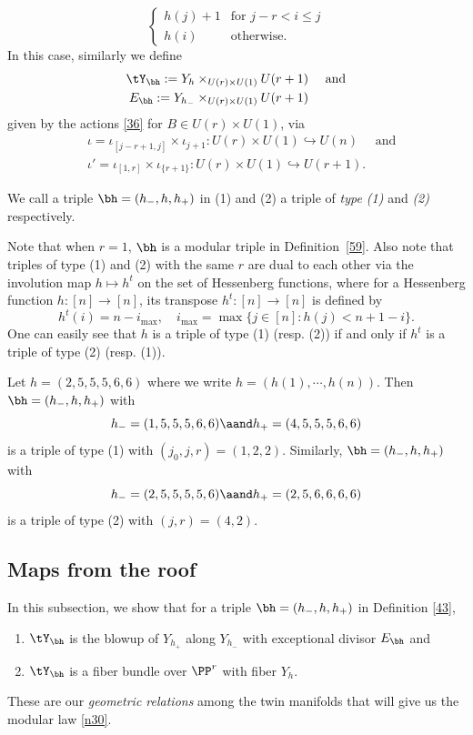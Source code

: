 \begin{definition}
\begin{enumerate}
\[\begin{cases}
			h(j)+1 &\text{for }j-r<i\leq j\\
		h(i) &\text{otherwise.}
		\end{cases}\]
		In this case, similarly we define 
		\begin{equation*}
			\begin{split}
				\tY_\bh :=Y_h\times_{U(r)\times U(1)}U(r+1)& \quad \text{ and}\\
				E_\bh:=Y_{h_-}\times_{U(r)\times U(1)}U(r+1)&
			\end{split}
		\end{equation*}
		given by the actions \eqref{36} for $B\in U(r)\times U(1)$,
		via 
		\begin{equation*}
			\begin{split}
				&\iota=\iota_{[j-r+1,j]}\times \iota_{j+1}:U(r)\times U(1)\hookrightarrow U(n) \quad \text{ and}\\
				&\iota'=\iota_{[1,r]}\times \iota_{\{r+1\}}:U(r)\times U(1)\hookrightarrow U(r+1).
			\end{split}
		\end{equation*} 
	\end{enumerate}
	We call a triple $\bh=(h_-,h,h_+)$ in (1) and (2) a triple of \emph{type (1)} and \emph{(2)} respectively.
\end{definition}
\begin{remark}\label{r1}
Note that when $r=1$, $\bh$ is a modular triple in Definition~\ref{59}.
Also note that triples of type (1) and (2) with the same $r$ are dual to each other via the involution map $h\mapsto h^t$ on the set of Hessenberg functions, where for a Hessenberg function $h:[n]\to[n]$, its transpose $h^t:[n]\to [n]$ is defined by
\[h^t(i)=n-i_{\max}, \quad  i_{\max}=\max\{j\in [n]:h(j)<n+1-i\}.\]
One can easily see that $h$ is a triple of type (1) (resp. (2)) if and only if $h^t$ is a triple of type (2) (resp. (1)). 
\end{remark}


\begin{example}\label{8}
	Let $h=(2,5,5,5,6,6)$ where we write $h=(h(1),\cdots, h(n))$.
	Then $\bh=(h_-,h,h_+)$ with 
	\[h_-=(1,5,5,5,6,6) \aand h_+=(4,5,5,5,6,6)\]
	 is a triple of type (1) with $(j_0,j,r)=(1,2,2)$. Similarly, $\bh=(h_-,h,h_+)$ with 
	 \[h_-=(2,5,5,5,5,6) \aand h_+=(2,5,6,6,6,6)\]
	 is a triple of type (2) with $(j,r)=(4,2)$.	 
\end{example}

\subsection{Maps from the roof}
In this subsection, we show that for a triple $\bh=(h_-,h,h_+)$ in Definition \ref{43}, \begin{enumerate}
\item[(* )] $\tY_\bh$ is the blowup of $Y_{h_+}$ along $Y_{h_-}$ with exceptional divisor $E_\bh$  and 
\item[(**)] $\tY_\bh$ is a fiber bundle over $\PP^r$ with fiber $Y_h$.
\end{enumerate} 
These are our \emph{geometric relations} among the twin manifolds  
that will give us the modular law \eqref{n30}. 

